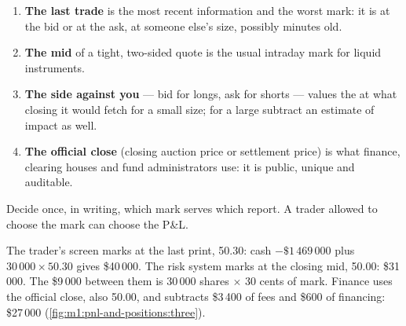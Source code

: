 \begin{method}\label{met:m1:pnl-and-positions:mark}
\begin{enumerate}
\item \textbf{The last trade} is the most recent information and the worst
  mark: it is at the bid or at the ask, at someone else's size, possibly
  minutes old.
\item \textbf{The mid} of a tight, two-sided quote is the usual intraday mark
  for liquid instruments.
\item \textbf{The side against you} --- bid for longs, ask for shorts ---
  values the  at what closing it would fetch for a small size; for a
  large  subtract an estimate of impact as well.
\item \textbf{The official close} (closing auction price or settlement price)
  is what finance, clearing houses and fund administrators use: it is
  public, unique and auditable.
\end{enumerate}
Decide once, in writing, which mark serves which report. A trader allowed to
choose the mark can choose the P\&L.
\end{method}

\begin{example}\label{ex:m1:pnl-and-positions:three}
The trader's screen marks at the last print, 50.30: cash $-\$1\,469\,000$
plus $30\,000 \times 50.30$ gives \$40\,000. The risk system marks at the
closing mid, 50.00: \$31\,000. The \$9\,000 between them is $30\,000$ shares
$\times$ 30 cents of mark. Finance uses the official close, also 50.00, and
subtracts \$3\,400 of fees and \$600 of financing: \$27\,000
(\cref{fig:m1:pnl-and-positions:three}).
\end{example}

\begin{omfigure}

\label{fig:m1:pnl-and-positions:three}
\end{omfigure}

